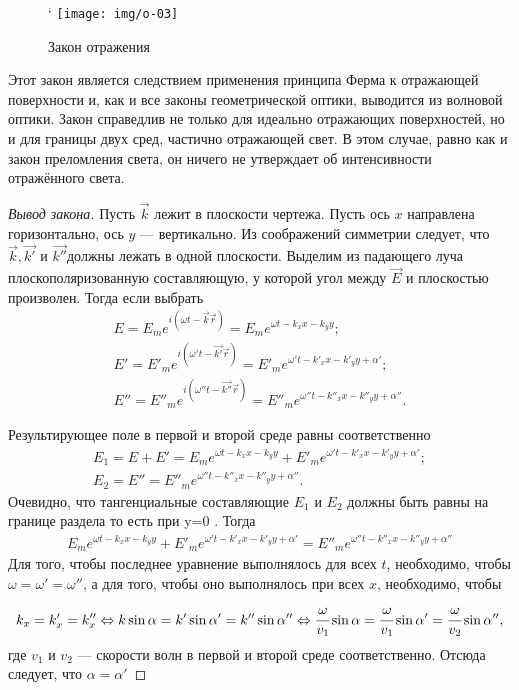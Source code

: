 	\begin{wrapfigure}[7]{L}{0.2\linewidth}
	`	\label{o-03-ris}
		\texttt{[image: img/o-03]}
		\caption{Закон отражения}
	\end{wrapfigure}
Этот закон является следствием применения принципа Ферма к отражающей поверхности и, как и все законы геометрической оптики, выводится из волновой оптики. Закон справедлив не только для идеально отражающих поверхностей, но и для границы двух сред, частично отражающей свет. В этом случае, равно как и закон преломления света, он ничего не утверждает об интенсивности отражённого света.\\
\begin{proof}[Вывод закона]
Пусть  $\vec{k}$ лежит в плоскости чертежа. Пусть ось $x$ направлена горизонтально, ось $y$ — вертикально. Из соображений симметрии следует, что  $\vec{k},  \vec{k'}$ и  $\vec{k''}$должны лежать в одной плоскости.
Выделим из падающего луча плоскополяризованную составляющую, у которой угол между  $\vec {E}$ и плоскостью произволен. Тогда если выбрать
\begin{gather*}
E=E_{m}e^{{i(\omega t-{\vec  {k}}{\vec  {r}})}}=E_{m}e^{{\omega t-k_{x}x-k_{y}y}};\\
 E'=E'_{m}e^{{i(\omega 't-{\vec  {k'}}{\vec  {r}})}}=E'_{m}e^{{\omega 't-k'_{x}x-k'_{y}y+\alpha '}};\\
  E''=E''_{m}e^{{i(\omega ''t-{\vec  {k''}}{\vec  {r}})}}=E''_{m}e^{{\omega ''t-k''_{x}x-k''_{y}y+\alpha ''}}.
\end{gather*}  

Результирующее поле в первой и второй среде равны соответственно
\begin{gather*}
 E_{1}=E+E'=E_{m}e^{{\omega t-k_{x}x-k_{y}y}}+E'_{m}e^{{\omega 't-k'_{x}x-k'_{y}y+\alpha '}};\\
E_2 = E'' = E''_m e^{\omega'' t - k''_x x - k''_y y + \alpha''} . 
\end{gather*}
Очевидно, что тангенциальные составляющие $E_1$ и $E_2$ должны быть равны на границе раздела то есть при y=0 .
Тогда
\begin{gather*}
E_m e^{\omega t - k_x x - k_y y} + E'_m e^{\omega' t - k'_x x - k'_y y + \alpha'} = E''_m e^{\omega'' t - k''_x x - k''_y y + \alpha''}
\end{gather*}
Для того, чтобы последнее уравнение выполнялось для всех $ t$,  необходимо, чтобы $\omega = \omega' = \omega''$, а для того, чтобы оно выполнялось при всех $x$,  необходимо, чтобы
\begin{gather*}
 k_x = k'_x = k''_x \Leftrightarrow k\sin{\alpha} = k'\sin{\alpha'} = k''\sin{\alpha''} \Leftrightarrow \cfrac {\omega} {v_1} \sin{\alpha} = \cfrac {\omega} {v_1} \sin{\alpha'} =  \cfrac {\omega} {v_2} \sin{\alpha''}, 
 \end{gather*}
где
$ v_{1}$ и $v_{2}$ — скорости волн в первой и второй среде соответственно.
Отсюда следует, что  $\alpha = \alpha'$ \end{proof}
